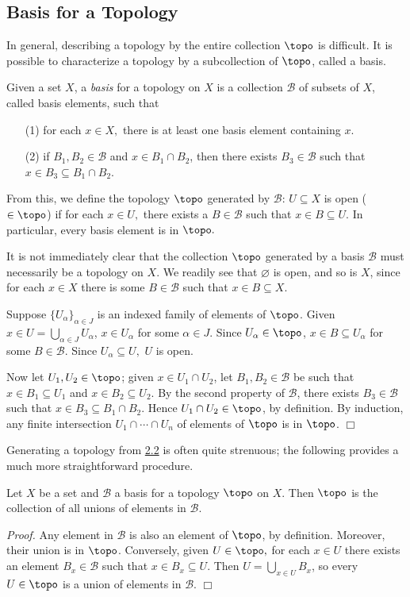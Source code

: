 \subsection{Basis for a Topology}
In general, describing a topology by the entire collection $\topo$ is difficult. It is possible to characterize a topology by a subcollection of $\topo$, called a basis.
\begin{definition}\label{2.2}
    Given a set $X$, a {\it basis} for a topology on $X$ is a collection $\mathcal{B}$ of subsets of $X$, called basis elements, such that
    \begin{enumerate}
        \item[(1)] for each $x \in X,$ there is at least one basis element containing $x$.
        \item[(2)] if $B_1, B_2 \in \mathcal{B}$ and $x \in B_1 \cap B_2$, then there exists $B_3 \in \mathcal{B}$ such that $x \in B_3 \subseteq B_1 \cap B_2$.
    \end{enumerate}
    From this, we define the topology $\topo$ generated by $\mathcal{B}$: $U \subseteq X$ is open ($\in \topo$) if for each $x \in U,$ there exists a $B \in \mathcal{B}$ such that $x \in B \subseteq U$. In particular, every basis element is in $\topo.$
\end{definition}
It is not immediately clear that the collection $\topo$ generated by a basis $\mathcal{B}$ must necessarily be a topology on $X$. We readily see that $\varnothing$ is open, and so is $X$, since for each $x \in X$ there is some $B \in \mathcal{B}$ such that $x \in B \subseteq X$.

Suppose $\{U_\alpha\}_{\alpha \in J}$ is an indexed family of elements of $\topo$. Given $x \in U = \bigcup_{\alpha \in J}U_\alpha$, $x \in U_\alpha$ for some $\alpha \in J$. Since $U_\alpha \in \topo$, $x \in B \subseteq U_\alpha$ for some $B \in \mathcal{B}$. Since $U_\alpha \subseteq U,$ $U$ is open.

Now let $U_1, U_2 \in \topo$; given $x\in U_1 \cap U_2$, let $B_1, B_2 \in \mathcal{B}$ be such that $x \in B_1 \subseteq U_1$ and $x \in B_2 \subseteq U_2$. By the second property of $\mathcal{B}$, there exists $B_3 \in \mathcal{B}$ such that $x \in B_3 \subseteq B_1 \cap B_2$. Hence $U_1 \cap U_2 \in \topo$, by definition. By induction, any finite intersection $U_1 \cap \cdots \cap U_n$ of elements of $\topo$ is in $\topo$. $\Box$

Generating a topology from \hyperref[2.2]{2.2} is often quite strenuous; the following provides a much more straightforward procedure.
\begin{lemma}\label{2.3}
    Let $X$ be a set and $\mathcal{B}$ a basis for a topology $\topo$ on $X$. Then $\topo$ is the collection of all unions of elements in $\mathcal{B}$.
\end{lemma}
{\it Proof.} Any element in $\mathcal{B}$ is also an element of $\topo$, by definition. Moreover, their union is in $\topo$. Conversely, given $U \in \topo,$ for each $x \in U$ there exists an element $B_x \in \mathcal{B}$ such that $x \in B_x \subseteq U$. Then $U = \bigcup_{x\in U} B_x$, so every $U \in \topo$ is a union of elements in $\mathcal{B}$. $\Box$

